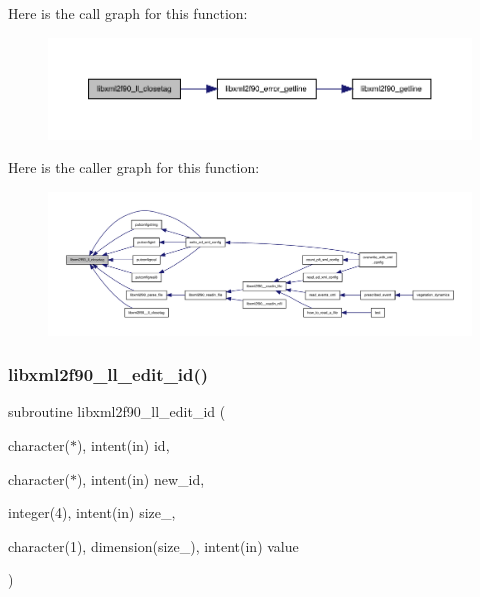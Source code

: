 Here is the call graph for this function\+:
\nopagebreak
\begin{figure}[H]
\begin{center}
\leavevmode
\includegraphics[width=350pt]{libxml2f90_8f90__pp_8f90_a23bfc785d957e044414ea18be75ac87a_cgraph}
\end{center}
\end{figure}
Here is the caller graph for this function\+:
\nopagebreak
\begin{figure}[H]
\begin{center}
\leavevmode
\includegraphics[width=350pt]{libxml2f90_8f90__pp_8f90_a23bfc785d957e044414ea18be75ac87a_icgraph}
\end{center}
\end{figure}
\mbox{\label{libxml2f90_8f90__pp_8f90_a69526b5264bc6d6f141bc8a9b0c7cc77}} 
\subsubsection{\texorpdfstring{libxml2f90\+\_\+ll\+\_\+edit\+\_\+id()}{libxml2f90\_ll\_edit\_id()}}
{\footnotesize\ttfamily subroutine libxml2f90\+\_\+ll\+\_\+edit\+\_\+id (\begin{DoxyParamCaption}\item[{character($\ast$), intent(in)}]{id,  }\item[{character($\ast$), intent(in)}]{new\+\_\+id,  }\item[{integer(4), intent(in)}]{size\+\_\+,  }\item[{character(1), dimension(size\+\_\+), intent(in)}]{value }\end{DoxyParamCaption})}

